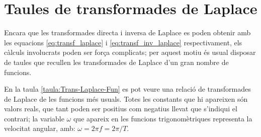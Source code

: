 \section{Taules de transformades de Laplace}

Encara que les transformades directa i inversa de Laplace es poden
obtenir amb les equacions \eqref{eq:transf_laplace} i
\eqref{eq:transf_inv_laplace} respectivament, els càlculs
involucrats poden ser força complicats; per aquest motiu és usual
disposar de taules que recullen les transformades de Laplace d'un
gran nombre de funcions.

En la taula \vref{taula:Trans-Laplace-Fun} es pot veure una relació de
transformades de Laplace de les funcions més usuals. Totes les
constants que hi apareixen són valors reals, que tant poden ser
positius com negatius llevat que s'indiqui el contrari; la variable
$\omega$ que apareix en les funcions trigonomètriques representa la
velocitat angular, amb: $\omega=2\pi f=2\pi/T$.

